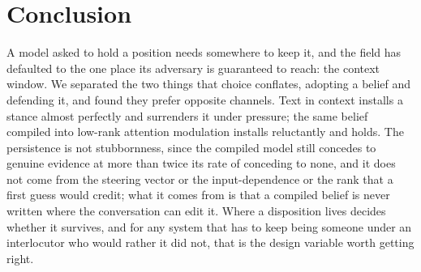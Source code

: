\section{Conclusion}
\label{sec:conclusion}

A model asked to hold a position needs somewhere to keep it, and the field has defaulted
to the one place its adversary is guaranteed to reach: the context window. We separated
the two things that choice conflates, adopting a belief and defending it, and found they
prefer opposite channels. Text in context installs a stance almost perfectly and
surrenders it under pressure; the same belief compiled into low-rank attention modulation
installs reluctantly and holds. The persistence is not stubbornness, since the compiled
model still concedes to genuine evidence at more than twice its rate of conceding to
none, and it does not come from the steering vector or the input-dependence or the rank
that a first guess would credit; what it comes from is that a compiled belief is never
written where the conversation can edit it. Where a disposition lives decides whether it
survives, and for any system that has to keep being someone under an interlocutor who
would rather it did not, that is the design variable worth getting right.
